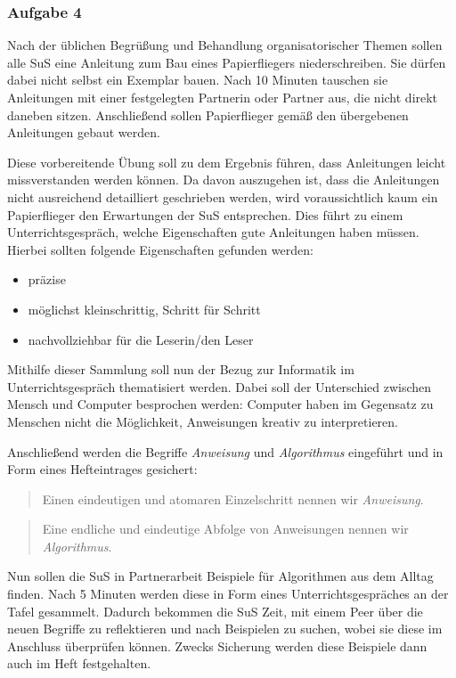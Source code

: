 \subsubsection{Aufgabe 4}


Nach der üblichen Begrüßung und Behandlung organisatorischer Themen sollen alle
SuS eine Anleitung zum Bau eines Papierfliegers niederschreiben. Sie dürfen
dabei nicht selbst ein Exemplar bauen. Nach 10 Minuten tauschen sie Anleitungen
mit einer festgelegten Partnerin oder Partner aus, die nicht direkt daneben
sitzen. Anschließend sollen Papierflieger gemäß den übergebenen Anleitungen
gebaut werden.

Diese vorbereitende Übung soll zu dem Ergebnis führen, dass Anleitungen leicht
missverstanden werden können. Da davon auszugehen ist, dass die Anleitungen
nicht ausreichend detailliert geschrieben werden, wird voraussichtlich kaum ein
Papierflieger den Erwartungen der SuS entsprechen. Dies führt zu einem
Unterrichtsgespräch, welche Eigenschaften gute Anleitungen haben müssen. Hierbei
sollten folgende Eigenschaften gefunden werden:
\begin{itemize}
	\item
		präzise
	\item
		möglichst kleinschrittig, Schritt für Schritt
	\item
		nachvollziehbar für die Leserin/den Leser
\end{itemize}
Mithilfe dieser Sammlung soll nun der Bezug zur Informatik im
Unterrichtsgespräch thematisiert werden. Dabei soll der Unterschied zwischen
Mensch und Computer besprochen werden: Computer haben im Gegensatz zu Menschen
nicht die Möglichkeit, Anweisungen kreativ zu interpretieren.

Anschließend werden die Begriffe \emph{Anweisung} und \emph{Algorithmus}
eingeführt und in Form eines Hefteintrages gesichert:
\begin{quote}
	Einen eindeutigen und atomaren Einzelschritt nennen wir
	\emph{Anweisung}.
\end{quote}
\begin{quote}
	Eine endliche und eindeutige Abfolge von Anweisungen nennen wir
	\emph{Algorithmus}.
\end{quote}

Nun sollen die SuS in Partnerarbeit Beispiele für Algorithmen aus dem Alltag
finden. Nach 5 Minuten werden diese in Form eines Unterrichtsgespräches an der
Tafel gesammelt. Dadurch bekommen die SuS Zeit, mit einem Peer über die neuen
Begriffe zu reflektieren und nach Beispielen zu suchen, wobei sie diese im
Anschluss überprüfen können. Zwecks Sicherung werden diese Beispiele dann auch
im Heft festgehalten.

